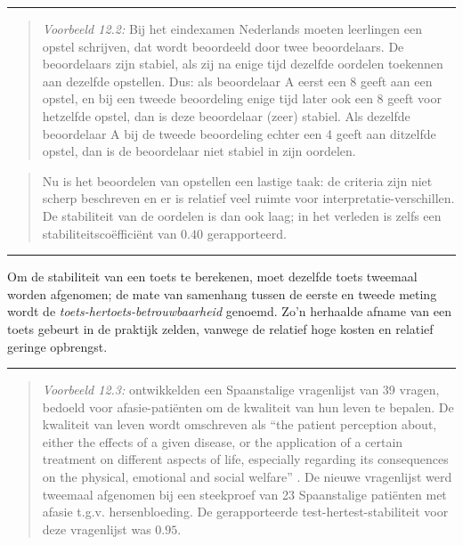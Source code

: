 \documentclass[
]{book}
\begin{document}
\begin{center}\rule{0.5\linewidth}{0.5pt}\end{center}

\begin{quote}
\emph{Voorbeeld 12.2:}
Bij het eindexamen Nederlands moeten leerlingen een opstel schrijven,
dat wordt beoordeeld door twee beoordelaars. De beoordelaars zijn
stabiel, als zij na enige tijd dezelfde oordelen toekennen aan dezelfde
opstellen. Dus: als beoordelaar A eerst een 8 geeft aan een opstel, en
bij een tweede beoordeling enige tijd later ook een 8 geeft voor
hetzelfde opstel, dan is deze beoordelaar (zeer) stabiel. Als dezelfde
beoordelaar A bij de tweede beoordeling echter een 4 geeft aan ditzelfde
opstel, dan is de beoordelaar niet stabiel in zijn oordelen.
\end{quote}

\begin{quote}
Nu is het beoordelen van opstellen een lastige taak: de criteria zijn
niet scherp beschreven en er is relatief veel ruimte voor
interpretatie-verschillen. De stabiliteit van de oordelen is dan ook
laag; in het verleden is zelfs een stabiliteitscoëfficiënt van \(0.40\)
gerapporteerd.
\end{quote}

\begin{center}\rule{0.5\linewidth}{0.5pt}\end{center}

Om de stabiliteit van een toets te berekenen, moet dezelfde toets
tweemaal worden afgenomen; de mate van samenhang tussen de eerste en
tweede meting wordt de \emph{toets-hertoets-betrouwbaarheid} genoemd. Zo'n
herhaalde afname van een toets gebeurt in de praktijk zelden, vanwege de
relatief hoge kosten en relatief geringe opbrengst.

\begin{center}\rule{0.5\linewidth}{0.5pt}\end{center}

\begin{quote}
\emph{Voorbeeld 12.3:}
\citep{Lata09} ontwikkelden
een Spaanstalige vragenlijst van 39 vragen, bedoeld voor
afasie-patiënten om de kwaliteit van hun leven te bepalen. De kwaliteit
van leven wordt omschreven als ``the patient perception about, either the
effects of a given disease, or the application of a certain treatment on
different aspects of life, especially regarding its consequences on the
physical, emotional and social welfare'' \citep[ p.379]{Lata09}. De nieuwe
vragenlijst werd tweemaal afgenomen bij een steekproef van 23
Spaanstalige patiënten met afasie t.g.v. hersenbloeding. De
gerapporteerde test-hertest-stabiliteit voor deze vragenlijst was
\(0.95\).
\end{quote}
\end{document}
